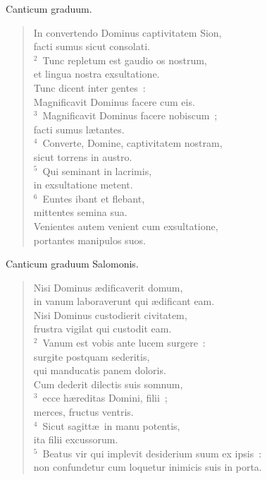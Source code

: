 \lettrine[lines=3,image=true,loversize=0.05,lraise=-0.03]{C}{}anticum graduum. \begin{flushleft}\begin{verse}\vspace{6pt}In convertendo Dominus captivitatem Sion,\\ facti sumus sicut consolati.\\
${}^{2}$~Tunc repletum est gaudio os nostrum,\\ et lingua nostra exsultatione.\\ Tunc dicent inter gentes~:\\ Magnificavit Dominus facere cum eis.\\
${}^{3}$~Magnificavit Dominus facere nobiscum~;\\ facti sumus l\ae tantes.\\
${}^{4}$~Converte, Domine, captivitatem nostram,\\ sicut torrens in austro.\\
${}^{5}$~Qui seminant in lacrimis,\\ in exsultatione metent.\\
${}^{6}$~Euntes ibant et flebant,\\ mittentes semina sua.\\ Venientes autem venient cum exsultatione,\\ portantes manipulos suos.\end{verse}\end{flushleft}



\lettrine[lines=3,image=true,loversize=0.05,lraise=-0.03]{C}{}anticum graduum Salomonis. \begin{flushleft}\begin{verse}\vspace{6pt}Nisi Dominus \ae dificaverit domum,\\ in vanum laboraverunt qui \ae dificant eam.\\ Nisi Dominus custodierit civitatem,\\ frustra vigilat qui custodit eam.\\
${}^{2}$~Vanum est vobis ante lucem surgere~:\\ surgite postquam sederitis,\\ qui manducatis panem doloris.\\ Cum dederit dilectis suis somnum,\\
${}^{3}$~ecce h\ae reditas Domini, filii~;\\ merces, fructus ventris.\\
${}^{4}$~Sicut sagitt\ae\ in manu potentis,\\ ita filii excussorum.\\
${}^{5}$~Beatus vir qui implevit desiderium suum ex ipsis~:\\ non confundetur cum loquetur inimicis suis in porta.\end{verse}\end{flushleft}



